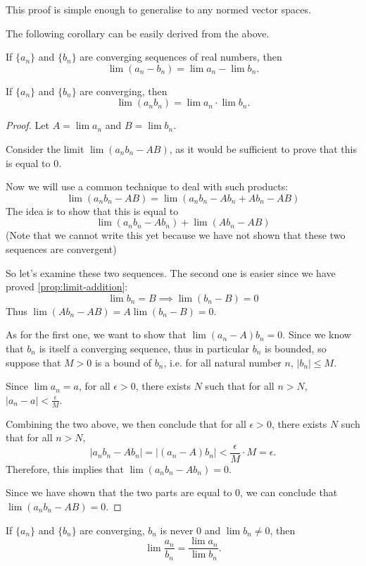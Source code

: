 \begin{remark}
This proof is simple enough to generalise to any normed vector spaces.
\end{remark}

The following corollary can be easily derived from the above.

\begin{corollary}
If $\{a_n\}$ and $\{b_n\}$ are converging sequences of real numbers, then
\[ \lim(a_n-b_n)=\lim a_n-\lim b_n. \]
\end{corollary}

\begin{proposition}
If $\{a_n\}$ and $\{b_n\}$ are converging, then
\[ \lim(a_nb_n)=\lim a_n \cdot \lim b_n. \]
\end{proposition}

\begin{proof}
Let $A=\lim a_n$ and $B=\lim b_n$.

Consider the limit $\lim(a_nb_n-AB)$, as it would be sufficient to prove that this is equal to $0$.

Now we will use a common technique to deal with such products:
\[ \lim(a_nb_n-AB)=\lim(a_nb_n-Ab_n+Ab_n-AB) \]
The idea is to show that this is equal to
\[ \lim(a_nb_n-Ab_n)+\lim(Ab_n-AB) \]
(Note that we cannot write this yet because we have not shown that these two sequences are convergent)

So let's examine these two sequences. The second one is easier since we have proved \cref{prop:limit-addition}:
\[ \lim b_n=B \implies \lim(b_n-B)=0 \]
Thus $\lim(Ab_n-AB)=A\lim(b_n-B)=0$.

As for the first one, we want to show that $\lim(a_n-A)b_n=0$. Since we know that $b_n$ is itself a converging sequence, thus in particular $b_n$ is bounded, so suppose that $M>0$ is a bound of $b_n$, i.e. for all natural number $n$, $|b_n|\le M$.

Since $\lim a_n=a$, for all $\epsilon>0$, there exists $N$ such that for all $n>N$, $|a_n-a|<\frac{\epsilon}{M}$.

Combining the two above, we then conclude that for all $\epsilon>0$, there exists $N$ such that for all $n>N$,
\[ |a_nb_n-Ab_n|=|(a_n-A)b_n|<\frac{\epsilon}{M}\cdot M=\epsilon. \]
Therefore, this implies that $\lim(a_nb_n-Ab_n)=0$.

Since we have shown that the two parts are equal to $0$, we can conclude that $\lim(a_nb_n-AB)=0$.
\end{proof}

\begin{proposition}
If $\{a_n\}$ and $\{b_n\}$ are converging, $b_n$ is never $0$ and $\lim b_n \neq 0$, then \[ \lim\frac{a_n}{b_n}=\frac{\lim a_n}{\lim b_n}. \]
\end{proposition}

